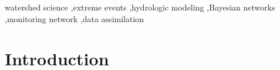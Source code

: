 \documentclass[preprint,review, 12pt]{elsarticle}
\begin{document}
\begin{frontmatter}
\begin{keyword}
watershed science \sep extreme events \sep hydrologic modeling \sep Bayesian networks \sep monitoring network \sep data assimilation


\end{keyword}

\end{frontmatter}


\linenumbers
\section{Introduction}
\end{document}
